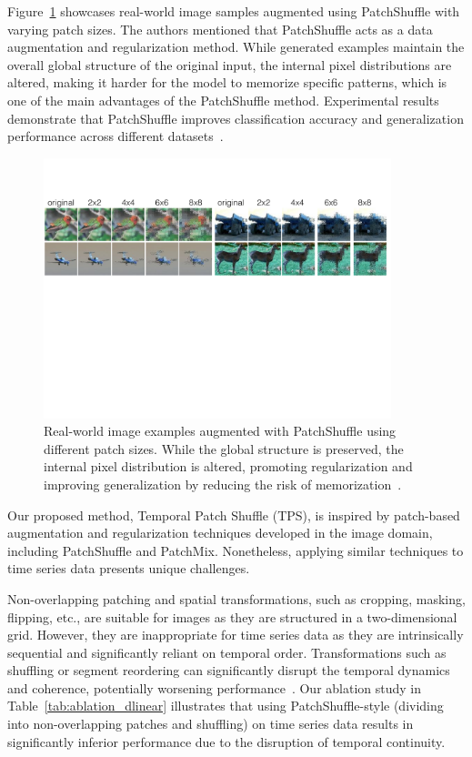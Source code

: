 Figure~\ref{fig:shuffleimages} showcases real-world image samples augmented using PatchShuffle with varying patch sizes. The authors mentioned that PatchShuffle acts as a data augmentation and regularization method. While generated examples maintain the overall global structure of the original input, the internal pixel distributions are altered, making it harder for the model to memorize specific patterns, which is one of the main advantages of the PatchShuffle method. Experimental results demonstrate that PatchShuffle improves classification accuracy and generalization performance across different datasets~\cite{kang2017patchshuffleregularization, hong2024patchmix}.

\begin{figure}[h!]
    \centering
\includegraphics[page=1, width=0.9\textwidth]{./images/ShuffleImages.pdf}
\caption{Real-world image examples augmented with PatchShuffle using different patch sizes. While the global structure is preserved, the internal pixel distribution is altered, promoting regularization and improving generalization by reducing the risk of memorization~\cite{kang2017patchshuffleregularization}.}
    \label{fig:shuffleimages}
\end{figure}



Our proposed method, Temporal Patch Shuffle (TPS), is inspired by patch-based augmentation and regularization techniques developed in the image domain, including PatchShuffle and PatchMix. Nonetheless, applying similar techniques to time series data presents unique challenges. 

Non-overlapping patching and spatial transformations, such as cropping, masking, flipping, etc., are suitable for images as they are structured in a two-dimensional grid. However, they are inappropriate for time series data as they are intrinsically sequential and significantly reliant on temporal order. Transformations such as shuffling or segment reordering can significantly disrupt the temporal dynamics and coherence, potentially worsening performance~\cite{arabi2024wavemaskmixexploringwaveletbasedaugmentations, chen2023fraugfrequencydomainaugmentation}. Our ablation study in Table~\ref{tab:ablation_dlinear} illustrates that using PatchShuffle-style (dividing into non-overlapping patches and shuffling) on time series data results in significantly inferior performance due to the disruption of temporal continuity.

